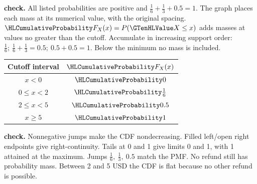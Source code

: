 \textbf{ check.} All listed probabilities are positive and $\frac{1}{6}+\frac{1}{3}+0.5=1$. The graph places each mass at its numerical value, with the original spacing.
$\cTwoCDFHL{F_X(x)}=P(\cTwoValue{X}\leq x)$ adds masses at values no greater than the cutoff. Accumulate in increasing support order: $\frac{1}{6};\ \frac{1}{6}+\frac{1}{3}=0.5;\ 0.5+0.5=1$. Below the minimum no mass is included.
\par\noindent\begin{minipage}[t]{.38\linewidth}\vspace{0pt}\centering\begin{tabular}{cc}\toprule Cutoff interval & $\cTwoCDFHL{F_X(x)}$ \\\midrule
$x<0$ & $\cTwoCDFHL{0}$ \\
$0\leq x<2$ & $\cTwoCDFHL{\frac{1}{6}}$ \\
$2\leq x<5$ & $\cTwoCDFHL{0.5}$ \\
$x\geq 5$ & $\cTwoCDFHL{1}$ \\
\bottomrule\end{tabular}\end{minipage}\hfill\begin{minipage}[t]{.59\linewidth}\vspace{0pt}\centering{}\end{minipage}\par
\textbf{ check.} Nonnegative jumps make the CDF nondecreasing. Filled left/open right endpoints give right-continuity. Tails at 0 and 1 give limits 0 and 1, with 1 attained at the maximum. Jumps $\frac{1}{6},\ \frac{1}{3},\ 0.5$ match the PMF. No refund still has probability mass. Between 2 and 5 USD the CDF is flat because no other refund is possible.
\clearpage
